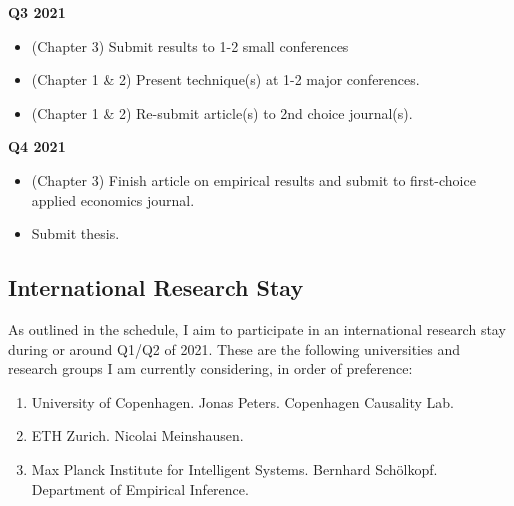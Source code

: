 \documentclass[a4paper,12pt]{article}
\begin{document}
\textbf{Q3 2021}

\begin{itemize}
\item (Chapter 3) Submit results to 1-2 small conferences
\item (Chapter 1 \& 2) Present technique(s) at 1-2 major conferences.
\item (Chapter 1 \& 2) Re-submit article(s) to 2nd choice journal(s).
\end{itemize}

\textbf{Q4 2021}

\begin{itemize}
\item (Chapter 3) Finish article on empirical results and submit to first-choice applied economics journal.
\item Submit thesis.
\end{itemize}


\subsection*{International Research Stay}

As outlined in the schedule, I aim to participate in an international research stay during or around Q1/Q2 of 2021. These are the following universities and research groups I am currently considering, in order of preference:

\begin{enumerate}
\item University of Copenhagen. Jonas Peters. Copenhagen Causality Lab.
\item ETH Zurich. Nicolai Meinshausen.
\item Max Planck Institute for Intelligent Systems. Bernhard Schölkopf. Department of Empirical Inference.
\end{enumerate}
\end{document}

